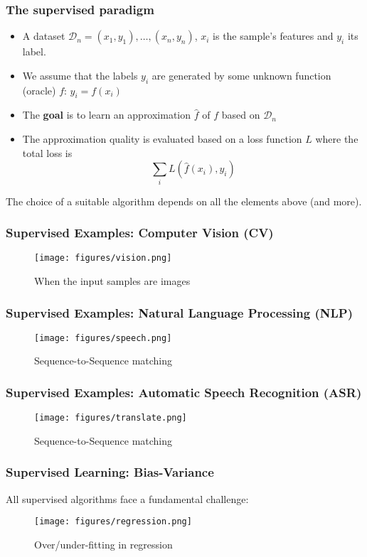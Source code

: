 \documentclass[aspectratio=169]{beamer}
\begin{document}
\begin{frame}
	\frametitle{The supervised paradigm}
	\begin{itemize}
		\item A dataset $\mathcal{D}_n = {(x_1,y_1), \ldots, (x_n, y_n)}$, $x_i$ is
		      the sample's features and $y_i$ its label.
		\item We assume that the labels $y_i$ are generated by some unknown
		      function (oracle) $f$: $y_i = f(x_i)$
		\item The \textbf{goal} is to learn an approximation $\hat{f}$ of $f$ based
		      on $\mathcal{D}_n$
		\item The approximation quality is evaluated based on a loss function $L$
		      where the total loss is
		      \[
			      \sum_i L(\hat{f}(x_i), y_i)
		      \]
	\end{itemize}
	The choice of a suitable algorithm depends on all the elements above (and more).
\end{frame}

\begin{frame}
	\frametitle{Supervised Examples: Computer Vision (CV)}
	\begin{figure}
		\texttt{[image: figures/vision.png]}
		\caption{When the input samples are images}\label{fig:}
	\end{figure}
\end{frame}

\begin{frame}
	\frametitle{Supervised Examples: Natural Language Processing (NLP)}
	\begin{figure}
		\texttt{[image: figures/speech.png]}
		\caption{Sequence-to-Sequence matching}\label{fig:}
	\end{figure}
\end{frame}

\begin{frame}
	\frametitle{Supervised Examples: Automatic Speech Recognition (ASR)}
	\begin{figure}
		\texttt{[image: figures/translate.png]}
		\caption{Sequence-to-Sequence matching}\label{fig:}
	\end{figure}
\end{frame}

\begin{frame}
	\frametitle{Supervised Learning: Bias-Variance}
	All supervised algorithms face a fundamental challenge:
	\begin{figure}
		\texttt{[image: figures/regression.png]}
		\caption{Over/under-fitting in regression}\label{fig:}
	\end{figure}
\end{frame}
\end{document}
